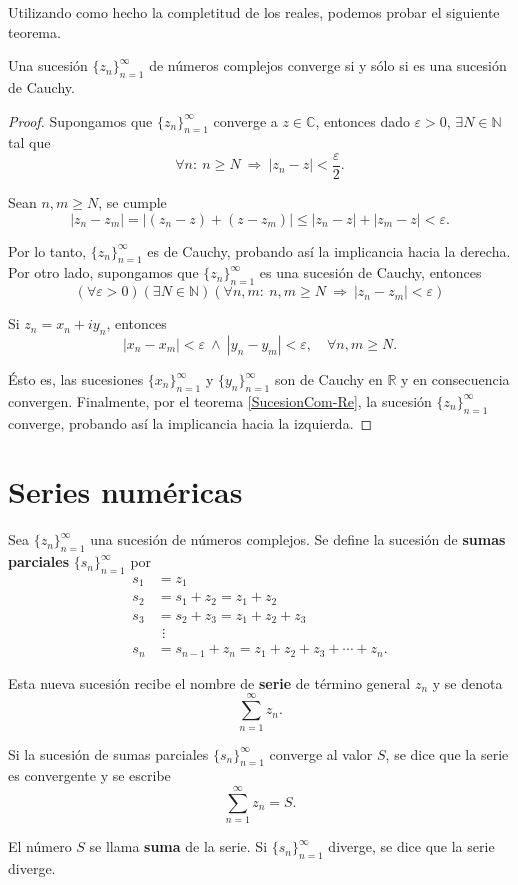 Utilizando como hecho la completitud de los reales, podemos probar el siguiente teorema.

\begin{teorema}
Una sucesión $\{z_n\}_{n=1}^{\infty}$ de números complejos converge si y sólo si es una sucesión de Cauchy.
\end{teorema}

\begin{proof}
Supongamos que $\{z_n\}_{n=1}^{\infty}$ converge a $z \in \mathbb{C}$, entonces dado $\varepsilon >0$, $\exists N \in \mathbb{N}$ tal que
$$\forall n:~ n \geq N ~\Rightarrow~ |z_n - z| < \frac{\varepsilon}{2}.$$

Sean $n,m \geq N$, se cumple
$$|z_n - z_m| = |(z_n - z) + (z - z_m)| \leq |z_n -z| + |z_m - z| < \varepsilon.$$

Por lo tanto, $\{z_n\}_{n=1}^{\infty}$ es de Cauchy, probando así la implicancia hacia la derecha.
\\

Por otro lado, supongamos que $\{z_n\}_{n=1}^{\infty}$ es una sucesión de Cauchy, entonces
$$(\forall \varepsilon > 0)(\exists N \in \mathbb{N})(\forall n,m: ~ n,m \geq N ~\Rightarrow~ |z_n-z_m| < \varepsilon)$$

Si $z_n = x_n + iy_n$, entonces
$$|x_n - x_m| < \varepsilon ~\wedge~ |y_n - y_m| < \varepsilon, \quad \forall n,m \geq N.$$

Ésto es, las sucesiones $\{x_n\}_{n=1}^{\infty}$ y  $\{y_n\}_{n=1}^{\infty}$  son de Cauchy en $\mathbb{R}$ y en consecuencia convergen. Finalmente, por el teorema \ref{SucesionCom-Re}, la sucesión $\{z_n\}_{n=1}^{\infty}$ converge, probando así la implicancia hacia la izquierda.
\end{proof}

\section{Series numéricas}

\begin{defi}
Sea $\{z_n\}_{n=1}^{\infty}$ una sucesión de números complejos. Se define la sucesión de \textbf{sumas parciales}  $\{s_n\}_{n=1}^{\infty}$ por 
\begin{align*}
    s_1 &= z_1 \\
    s_2 &= s_1 + z_2 = z_1+ z_2 \\
    s_3 &= s_2 + z_3 = z_1 + z_2 + z_3 \\
    &~\,\vdots \\
    s_n &= s_{n-1} + z_n = z_1 + z_2 + z_3 + \cdots + z_n.
\end{align*}

Esta nueva sucesión recibe el nombre de \textbf{serie} de término general $z_n$ y se denota
$$\sum_{n=1}^{\infty} z_n.$$

Si la sucesión de sumas parciales $\{s_n\}_{n=1}^{\infty}$ converge al valor $S$, se dice que la serie es convergente y se escribe
$$\sum_{n=1}^{\infty} z_n = S.$$

El número $S$ se llama \textbf{suma} de la serie. Si   $\{s_n\}_{n=1}^{\infty}$ diverge, se dice que la serie diverge.
\end{defi}

